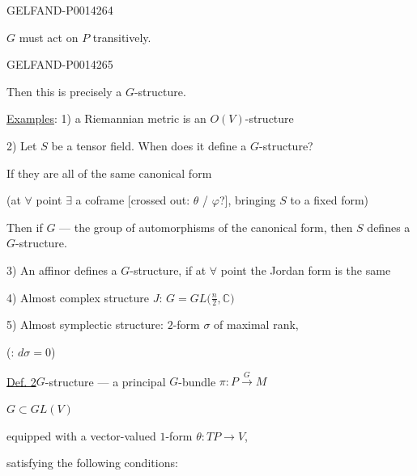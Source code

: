 \begin{GelfandAdjacentEvidence}{GELFAND-P001426}{4}


\(G\) must act on \(P\) transitively.
\end{GelfandAdjacentEvidence}
\begin{GelfandAdjacentEvidence}{GELFAND-P001426}{5}


Then this is precisely a \(G\)-structure.

\uline{Examples}: 1) a Riemannian metric is an \(O(V)\)-structure

2) Let \(S\) be a tensor field. When does it define a \(G\)-structure?

If they are all of the same canonical form

(at \(\forall\) point \(\exists\) a coframe
[crossed out: \(\theta\) / \(\varphi\)?], bringing \(S\) to a fixed form)
\end{GelfandAdjacentEvidence}


Then if \(G\) — the group of automorphisms of the canonical form, then \(S\) defines a \(G\)-structure.

3) An affinor defines a \(G\)-structure, if at \(\forall\) point the Jordan form is the same

4) Almost complex structure \(J\): \(G=GL\bigl(\frac{n}{2},\mathbb C\bigr)\)

5) Almost symplectic structure: \(2\)-form \(\sigma\) of maximal rank,

(: \(d\sigma=0\))

\uline{Def. 2}\quad \(G\)-structure — a principal \(G\)-bundle
\(\pi\colon P\overset{G}{\longrightarrow}M\)

\(G\subset GL(V)\)

equipped with a vector-valued \(1\)-form \(\theta\colon TP\to V\),

satisfying the following conditions:


